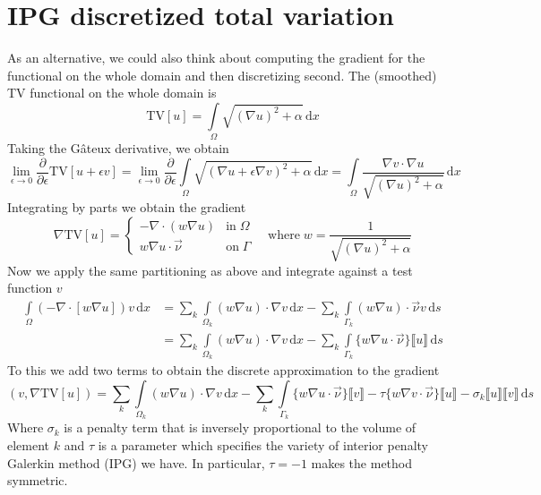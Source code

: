 \documentclass[a4paper,12pt]{article}
\begin{document}
\section{IPG discretized total variation}
As an alternative, we could also think about computing the gradient for the functional on the whole
domain and then discretizing second. The (smoothed) TV functional on the whole domain is
\begin{equation}
\text{TV}[u] = \int\limits_{\Omega} \sqrt{(\nabla u)^2+\alpha} \,\mathrm{d}x
\end{equation}
Taking the G\^ateux derivative, we obtain 
\begin{equation}
\lim_{\epsilon\rightarrow 0}\frac{\partial}{\partial \epsilon}\text{TV}[u+\epsilon v] =
\lim_{\epsilon\rightarrow 0}\frac{\partial}{\partial \epsilon}
\int\limits_{\Omega} \sqrt{(\nabla u+\epsilon \nabla v)^2+\alpha} \,\mathrm{d}x = 
\int\limits_{\Omega} \frac{\nabla v\cdot\nabla u}
{\sqrt{(\nabla u)^2+\alpha}} \,\mathrm{d}x  
\end{equation}
Integrating by parts we obtain the gradient 
\begin{equation}
\nabla \text{TV}[u] = \begin{cases}
-\nabla\cdot (w\nabla u)&\text{in}\;\Omega\\
w\nabla u\cdot \vec\nu &\text{on}\;\Gamma
\end{cases}\quad\text{where}\;w=\frac{1}{\sqrt{(\nabla u)^2+\alpha}}
\end{equation}
Now we apply the same partitioning as above and integrate against a test function $v$
\begin{align}
\int\limits_\Omega (-\nabla\cdot[w\nabla u])v\,\mathrm{d}x &= 
\sum\limits_k\int\limits_{\Omega_k} (w \nabla u)\cdot \nabla v\,\mathrm{d}x -
\sum\limits_k\int\limits_{\Gamma_k} (w \nabla u)\cdot \vec\nu v\,\mathrm{d}s \\
& = 
\sum\limits_k\int\limits_{\Omega_k} (w \nabla u)\cdot \nabla v\,\mathrm{d}x -
\sum\limits_k\int\limits_{\Gamma_k} \{w\nabla u\cdot\vec \nu\}\llbracket u\rrbracket\,\mathrm{d}s
\end{align}
To this we add two terms to obtain the discrete approximation to the gradient
\begin{equation}
(v,\nabla \text{TV}[u])= 
\sum\limits_k\int\limits_{\Omega_k} (w \nabla u)\cdot \nabla v\,\mathrm{d}x -
\sum\limits_k\int\limits_{\Gamma_k} \{w\nabla u\cdot\vec \nu\}\llbracket v\rrbracket
-\tau  \{w\nabla v\cdot\vec \nu\}\llbracket u\rrbracket -
\sigma_k\llbracket u\rrbracket\llbracket v\rrbracket\,\mathrm{d}s
\end{equation}
Where $\sigma_k$ is a penalty term that is inversely proportional to the volume of element $k$ and $\tau$
is a parameter which specifies the variety of interior penalty Galerkin method (IPG) we have. In particular,
$\tau = -1$ makes the method symmetric. 
\end{document}
